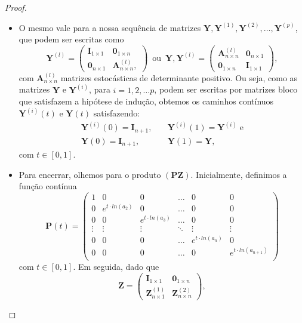 \documentclass[twoside,openright,titlepage,numbers=noenddot,headinclude,  lineheaders footinclude=true,cleardoublepage=empty,
                                BCOR=5mm,paper=a4,fontsize=12pt ]{scrbook}
\theoremstyle{definition}
\begin{document}
\begin{proof}
\begin{itemize}
\item
O mesmo vale para a nossa sequência de matrizes
$\mathbf{Y}, \mathbf{Y}^{(1)}, \mathbf{Y}^{(2)},
\ldots, 
\mathbf{Y}^{(p)}$, que podem ser escritas como
\[
 \mathbf{Y}^{(l)} = 
\begin{pmatrix}
 \mathbf{I}_{1 \times 1} &  \mathbf{0}_{1 \times n}\\
\mathbf{0}_{n \times 1} & \mathbf{A}^{(l)}_{n \times n}, 
\end{pmatrix}
\, \text{ ou } \,
\mathbf{Y}, \mathbf{Y}^{(l)} = 
\begin{pmatrix}
\mathbf{A}^{(l)}_{n \times n} & \mathbf{0}_{n \times 1} \\
 \mathbf{0}_{1 \times n} & \mathbf{I}_{1 \times 1}
\end{pmatrix}
,
\]
com $\mathbf{A}^{(l)}_{n \times n}$ matrizes estocásticas 
de determinante positivo. Ou seja, como as matrizes 
 $\mathbf{Y}$ e $\mathbf{Y}^{(i)}$, para $i = 1, 2, \ldots p$,
podem ser escritas por matrizes bloco que satisfazem a 
hipótese de indução, obtemos os caminhos contínuos
$\bm{Y}^{(i)}(t)$ e $\bm{Y}(t)$ satisfazendo:
\begin{align*}
\mathbf{Y}^{(i)}(0) = \mathbf{I}_{n+1}, \quad &  \mathbf{Y}^{(i)}(1) = \mathbf{Y}^{(i)} \; \text{e} \\
\mathbf{Y}(0) = \mathbf{I}_{n+1}, \quad &  \mathbf{Y}(1) = \mathbf{Y},
\end{align*}
com $t \in [0,1]$.
\item
Para encerrar, olhemos para o produto $(\mathbf{PZ})$. Inicialmente,
definimos a função contínua
\[
\mathbf{P}(t) = 
\begin{pmatrix}
1 & 0   & 0   & \ldots & 0 & 0\\
0 & e^{t \cdot ln(a_2)} & 0   & \ldots & 0 & 0\\
0 & 0   & e^{t \cdot ln(a_3)} & \ldots & 0 & 0\\
\vdots & \vdots   & \vdots   & \ddots & \vdots & \vdots\\
0 & 0   & 0 & \ldots & e^{t \cdot ln(a_n)} & 0\\
0 & 0   & 0 & \ldots & 0 & e^{t \cdot ln(a_{n+1})}\\
\end{pmatrix}
\]
com $t \in [0,1]$. Em seguida, dado que
\[
\mathbf{Z} = 
\begin{pmatrix}
\mathbf{I}_{1 \times 1} & \mathbf{0}_{1 \times n} \\
\mathbf{Z}_{n \times 1}^{(1)} & \mathbf{Z}_{n \times n}^{(2)}
\end{pmatrix}
,
\]
\end{itemize}
\end{proof}
\end{document}

